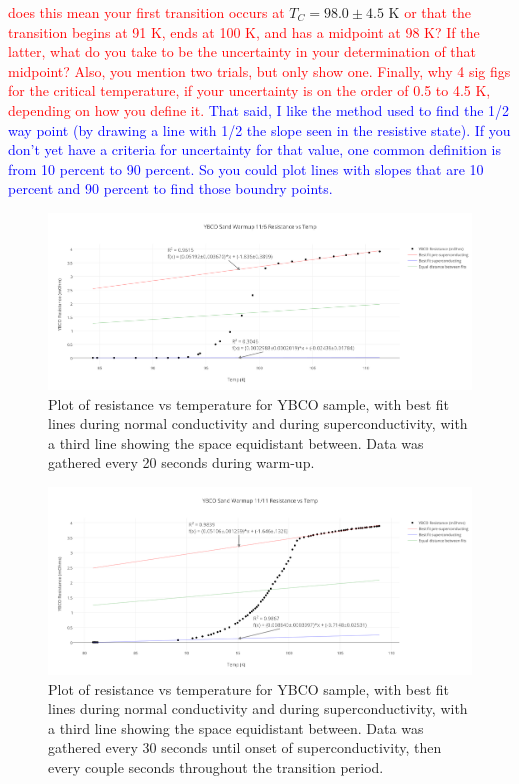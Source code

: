 \documentclass[prb,preprint]{revtex4-1}
\begin{document}
\textcolor{red}{does this mean your first transition occurs at }$T_C = 98.0 \pm 4.5 \text{ K}$ \textcolor{red}{ or that the transition begins at 91 K, ends at 100 K, and has a midpoint at 98 K? If the latter, what do you take to be the uncertainty in your determination of that midpoint? Also, you mention two trials, but only show one. Finally, why 4 sig figs for the critical temperature, if your uncertainty is on the order of 0.5 to 4.5 K, depending on how you define it. } 
\textcolor{blue}{That said, I like the method used to find the 1/2 way point (by drawing a line with 1/2 the slope seen in the resistive state). If you don't yet have a criteria for uncertainty for that value, one common definition is from 10 percent to 90 percent. So you could plot lines with slopes that are 10 percent and 90 percent to find those boundry points.} 

\begin{figure}[h!]
\centering
\includegraphics[width=7in]{ybco_sand_warmup_116_resistance_vs_temp.png}
\caption{Plot of resistance vs temperature for YBCO sample, with best fit lines during normal conductivity and during superconductivity, with a third line showing the space equidistant between. Data was gathered every 20 seconds during warm-up.}
\label{YBCOplot1}
\end{figure}

\begin{figure}[h!]
\centering
\includegraphics[width=7in]{ybco_sand_warmup_1111_resistance_vs_temp.png}
\caption{Plot of resistance vs temperature for YBCO sample, with best fit lines during normal conductivity and during superconductivity, with a third line showing the space equidistant between. Data was gathered every 30 seconds until onset of superconductivity, then every couple seconds throughout the transition period.}
\label{YBCOplot2}
\end{figure}
\end{document}
